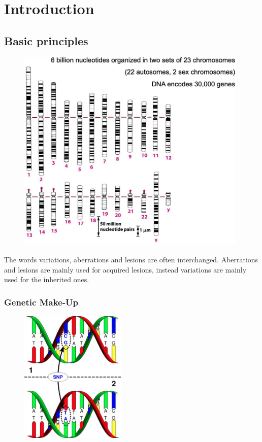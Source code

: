\graphicspath{{chapters/ThebasicsImages/}}


\chapter{Introduction}
\section{Basic principles} \label{chap: Basics}

\begin{figure}[H]
  \includegraphics[width=4.32507in,height=3.86281in]{image1.jpeg}
  \centering
  \caption{}
\end{figure}


The words variations, aberrations and lesions are often interchanged.
Aberrations and lesions are mainly used for acquired lesions, instead variations
are mainly used for the inherited ones.

\hypertarget{genetic-make-up}{%
\subsection{Genetic Make-Up}\label{genetic-make-up}}

\begin{figure}[H]
  \includegraphics[width=1.97816in,height=2.50248in]{image2.jpeg}
  \centering
  \caption{}
  \label{fig: SNP}
\end{figure}


